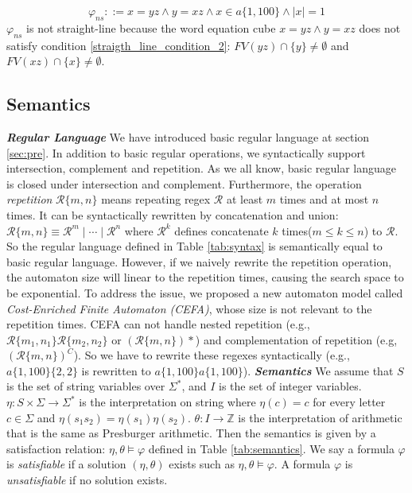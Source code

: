 \documentclass[runningheads]{llncs}
\newcommand*{\regex}{\mathcal{R}}
\newcommand*{\highlight}[1]{\textbf{\textit{#1}}}
\begin{document}
\begin{example}
  \begin{equation} \label{eq:1}
    \varphi_{ns} ::=  x =yz \wedge y = xz \wedge x\in a\{1,100\} \wedge |x| = 1
  \end{equation}
  $\varphi_{ns}$ is not straight-line because the word equation cube\newline
  $x = yz \wedge y = xz$ does not satisfy condition \ref{straigth_line_condition_2}: $FV(yz) \cap \{y\} \not = \emptyset$ and $FV(xz) \cap \{x\} \not = \emptyset$.
\end{example}

\subsection{Semantics}
\highlight{Regular Language} We have introduced basic regular language at
section \ref{sec:pre}. In addition to basic regular operations, we syntactically support intersection, complement and repetition. As we all know, basic regular language is closed under intersection and complement. Furthermore, the operation \emph{repetition} $\regex\{m,n\}$ means repeating regex $\regex$ at least $m$ times and at most $n$ times. It can be syntactically rewritten by concatenation and union:
$\regex\{m,n\} \equiv \regex^m\mid\cdots\mid\regex^n$ where $\regex^k$ defines concatenate $k$ times($m\leq k\leq n$) to $\regex$. So the regular language defined in Table \ref{tab:syntax} is semantically equal to basic regular language. However, if we naively rewrite the repetition operation, the automaton size will linear to the repetition times, causing the search space to be exponential. To address the issue, we proposed a new automaton model called \emph{Cost-Enriched Finite Automaton (CEFA)}, whose size is not relevant to the repetition times. CEFA can not handle nested repetition (e.g., $\regex\{m_1,n_1\} \regex\{m_2,n_2\}$ or $(\regex\{m, n\}) *$) and complementation of repetition (e.g, $(\regex\{m,n\})^C$). So we have to rewrite these regexes syntactically (e.g., $a\{1,100\}\{2,2\}$ is rewritten to $a\{1,100\}a\{1,100\}$).\newline
\highlight{Semantics} We assume that $S$ is the set of string variables over $\Sigma^*$, and $I$ is the set of integer variables. $\eta: S\times\Sigma\rightarrow\Sigma^*$ is the interpretation on string where $\eta(c)=c$ for every letter $c\in \Sigma$ and $\eta(s_1s_2)=\eta(s_1)\eta(s_2)$. $\theta: I\rightarrow\mathbb{Z}$ is the interpretation of arithmetic that is the same as Presburger arithmetic. Then the semantics is given by a satisfaction relation: $\eta, \theta\models \varphi$ defined in Table \ref{tab:semantics}. We say a formula $\varphi$ is \emph{satisfiable} if a solution $(\eta, \theta)$ exists such as $\eta, \theta\models \varphi$. A formula $\varphi$ is \emph{unsatisfiable} if no solution exists.
\end{document}
